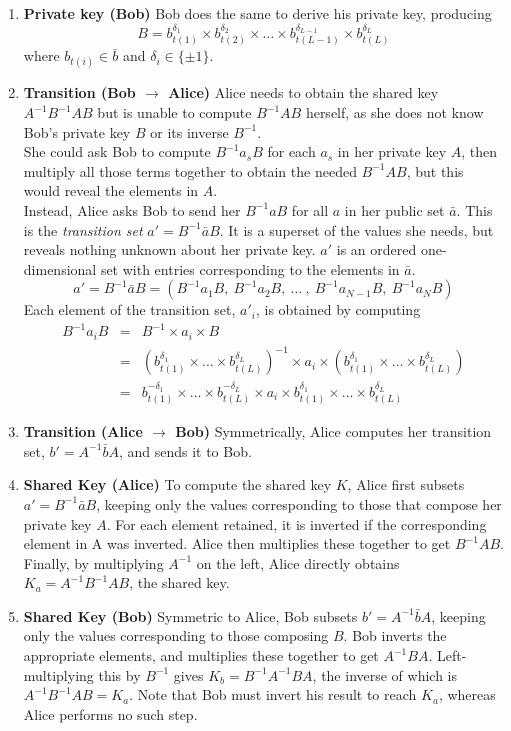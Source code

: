 \begin{enumerate}[1.]
	\item \textbf{Private key (Bob)} Bob does the same to derive his private key, producing 
		$$B = b_{t(1)}^{\delta_1} \times b_{t(2)}^{\delta_2} \times \ldots \times b_{t(L-1)}^{\delta_{L-1}} \times b_{t(L)}^{\delta_L}$$
		where $b_{t(i)} \in \bar{b}$ and $\delta_i \in \{\pm1\}$.
	\item \textbf{Transition (Bob $\rightarrow$ Alice)} Alice needs to obtain the shared key $A^{-1}B^{-1}AB$ but is unable to compute $B^{-1}AB$ herself, as she does not know Bob's private key $B$ or its inverse $B^{-1}$.\\
		She could ask Bob to compute $B^{-1} a_{s} B$ for each $a_{s}$ in her private key $A$, then multiply all those terms together to obtain the needed $B^{-1}AB$, but this would reveal the elements in $A$. \\
		Instead, Alice asks Bob to send her $B^{-1}aB$ for all $a$ in her public set $\bar{a}$. This is the \textit{transition set} $a' = B^{-1} \bar{a} B$. It is a superset of the values she needs, but reveals nothing unknown about her private key. $a'$ is an ordered one-dimensional set with entries corresponding to the elements in $\bar{a}$.
		$$a' = B^{-1}\bar{a}B = (B^{-1} a_1 B, \ B^{-1} a_2 B, \ \dots \ , \ B^{-1} a_{N-1} B, \ B^{-1} a_{N} B)$$
		Each element of the transition set, $a'_i$, is obtained by computing
		\begin{eqnarray*}
			B^{-1} a_i B &=& B^{-1} \times a_i \times B \\
			&=& (b_{t(1)}^{\delta_1} \times \ldots \times b_{t(L)}^{\delta_L})^{-1} \times a_i \times (b_{t(1)}^{\delta_1} \times \ldots \times b_{t(L)}^{\delta_L}) \\
			&=& b_{t(1)}^{-\delta_1} \times \ldots \times b_{t(L)}^{-\delta_L} \times a_i \times b_{t(1)}^{\delta_1} \times \ldots \times b_{t(L)}^{\delta_L}
		\end{eqnarray*}
	\item \textbf{Transition (Alice $\rightarrow$ Bob)} Symmetrically, Alice computes her transition set, $b'=A^{-1}\bar{b}A$, and sends it to Bob.
	\item \textbf{Shared Key (Alice)} To compute the shared key $K$, Alice first subsets $a' = B^{-1} \bar{a} B$, keeping only the values corresponding to those that compose her private key $A$. For each element retained, it is inverted if the corresponding element in A was inverted. Alice then multiplies these together to get $B^{-1}AB$. Finally, by multiplying $A^{-1}$ on the left, Alice directly obtains $K_a = A^{-1}B^{-1}AB$, the shared key.
	\item \textbf{Shared Key (Bob)} Symmetric to Alice, Bob subsets $b' = A^{-1} \bar{b} A$, keeping only the values corresponding to those composing $B$. Bob inverts the appropriate elements, and multiplies these together to get $A^{-1}BA$. Left-multiplying this by $B^{-1}$ gives $K_b = B^{-1}A^{-1}BA$, the inverse of which is $A^{-1}B^{-1}AB = K_a$. Note that Bob must invert his result to reach $K_a$, whereas Alice performs no such step.

\end{enumerate}

